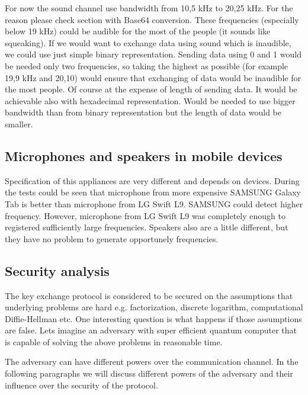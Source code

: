 \documentclass[11pt,titlepage]{article}
\theoremstyle{plain}
\begin{document}
\vspace{5mm}

For now the sound channel use bandwidth from 10,5 kHz to 20,25 kHz. For the reason please check section with Base64 conversion. These frequencies (especially below 19 kHz) could be audible for the most of the people (it sounds like squeaking). If we would want to exchange data using sound which is inaudible, we could use just simple binary representation. Sending data using 0 and 1 would be needed only two frequencies, so taking the highest as possible (for example 19,9 kHz and 20,10) would ensure that exchanging of data would be inaudible for the most people. Of course at the expense of length of sending data. It would be achievable also with hexadecimal representation. Would be needed to use bigger bandwidth than from binary representation but the length of data would be smaller.

\subsection{Microphones and speakers in mobile devices}
Specification of this appliances are very different and depends on devices. During the tests could be seen that microphone from more expensive SAMSUNG Galaxy Tab is better than microphone from LG Swift L9. SAMSUNG could detect higher frequency. However, microphone from LG Swift L9 was completely enough to registered sufficiently large frequencies. Speakers also are a little different, but they have no problem to generate opportunely frequencies.



\subsection{Security analysis}
The key exchange protocol is considered to be secured on the assumptions that underlying problems are hard e.g. factorization, discrete logarithm, computational Diffie-Hellman etc. One interesting question is what happens if those assumptions are false. Lets imagine an adversary with super efficient quantum computer that is capable of solving the above problems in reasonable time.

\vspace{5mm}

The adversary can have different powers over the communication channel. In the following paragraphs we will discuss different powers of the adversary and their influence over the security of the protocol.
\end{document}
